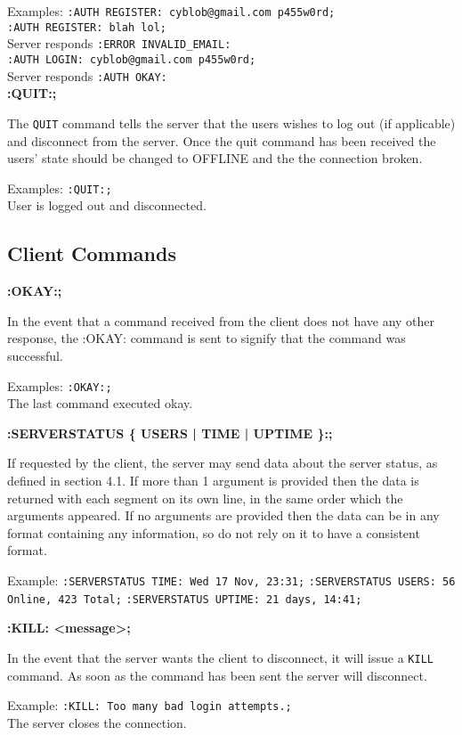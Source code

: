 Examples:
\texttt{:AUTH REGISTER: cyblob@gmail.com p455w0rd;} \\
\texttt{:AUTH REGISTER: blah lol;} \\
Server responds \texttt{:ERROR INVALID_EMAIL:} \\
\texttt{:AUTH LOGIN: cyblob@gmail.com p455w0rd;}\\
Server responds \texttt{:AUTH OKAY:} \\

{\bf :QUIT:;}

The \texttt{QUIT} command tells the server that the users wishes to log out (if applicable) and disconnect from the server. Once the quit command has been received the users’ state should be changed to OFFLINE and the the connection broken.

Examples:
\texttt{:QUIT:;} \\
User is logged out and disconnected.

\subsection{Client Commands}

{\bf :OKAY:;}

In the event that a command received from the client does not have any other response, the :OKAY: command is sent to signify that the command was successful. 

Examples:
\texttt{:OKAY:;}\\
The last command executed okay.

{\bf :SERVERSTATUS \{ USERS | TIME | UPTIME \}:;}

If requested by the client, the server may send data about the server status, as defined in section 4.1. If more than 1 argument is provided then the data is returned with each segment on its own line, in the same order which the arguments appeared. If no arguments are provided then the data can be in any format containing any information, so do not rely on it to have a consistent format.

Example:
\texttt{:SERVERSTATUS TIME: Wed 17 Nov, 23:31;}
\texttt{:SERVERSTATUS USERS: 56 Online, 423 Total;}
\texttt{:SERVERSTATUS UPTIME: 21 days, 14:41;}

{\bf :KILL: <message>;}

In the event that the server wants the client to disconnect, it will issue a \texttt{KILL} command. As soon as the command has been sent the server will disconnect. 

Example:
\texttt{:KILL: Too many bad login attempts.;}\\
The server closes the connection.

